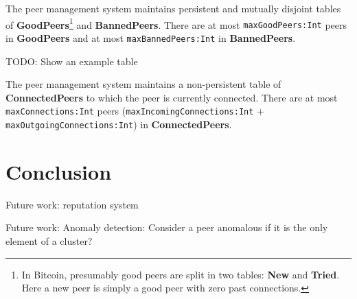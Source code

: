 \documentclass[]{llncs}
\newcommand{\conf}[2]{{\color{dkgreen}\texttt{#1:#2}}}
\begin{document}
The peer management system maintains persistent and mutually disjoint
tables of \textbf{GoodPeers}\footnote{In Bitcoin, presumably good
peers are split in two tables: \textbf{New} and \textbf{Tried}. Here a
new peer is simply a good peer with zero past connections.} and
\textbf{BannedPeers}. There are at most \conf{maxGoodPeers}{Int} peers
in \textbf{GoodPeers} and at most \conf{maxBannedPeers}{Int} in
\textbf{BannedPeers}.

\begin{example}
TODO: Show an example table
\end{example}

The peer management system maintains a non-persistent table of
\textbf{ConnectedPeers} to which the peer is currently connected.
There are at most \conf{maxConnections}{Int} peers (\conf{maxIncomingConnections}{Int} + \conf{maxOutgoingConnections}{Int}) in
\textbf{ConnectedPeers}.

\section{Conclusion}


Future work: reputation system

Future work: Anomaly detection: Consider a peer anomalous if it is the only element of a
cluster?


 

\end{document}
